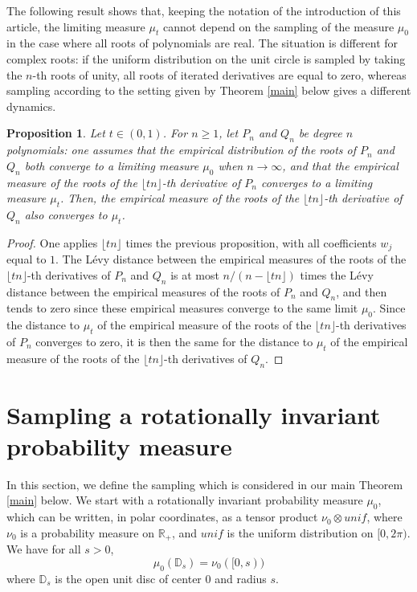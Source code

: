 \documentclass[11pt]{amsart}
\newtheorem{proposition}[theorem]{Proposition}
\begin{document}
The following result shows that, keeping the notation of the introduction of this article, 
the limiting measure $\mu_t$ cannot depend on the sampling of the measure $\mu_0$ in the case where all roots of polynomials are real. 
The situation is different for complex roots: if the uniform distribution on the unit circle is sampled by taking the $n$-th roots of unity, all roots of iterated derivatives are equal to zero, whereas 
sampling according to the setting given by Theorem \ref{main} below gives a different dynamics. 


\begin{proposition}
Let $t \in (0,1)$. 
For $n \geq 1$, let $P_n$ and $Q_n$ be degree $n$ polynomials: one assumes that the empirical distribution of the roots of $P_n$ and $Q_n$ both converge to a limiting measure $\mu_0$ when $n \rightarrow \infty$, and 
that the empirical measure of the roots of the $\lfloor t n \rfloor$-th derivative of $P_n$ converges to a limiting measure $\mu_t$. Then, the empirical measure of the roots of the $\lfloor t n \rfloor$-th derivative of $Q_n$ also converges to $\mu_t$.
\end{proposition}
\begin{proof}
One applies $\lfloor t n \rfloor$ times the previous proposition, with all coefficients $w_j$ equal to $1$. 
The L\'evy distance between the empirical measures of the roots of the  $\lfloor t n \rfloor$-th derivatives of $P_n$ and $Q_n$ is at most $n/(n - \lfloor t n \rfloor)$ times the L\'evy distance between the empirical measures of the roots of $P_n$ and $Q_n$, and 
then tends to zero since these empirical measures converge to the same limit $\mu_0$. 
Since the distance to $\mu_t$ of the empirical measure
 of the roots of the  $\lfloor t n \rfloor$-th derivatives of $P_n$ converges to zero, it is then the same for the distance to $\mu_t$ of the empirical measure
 of the roots of the  $\lfloor t n \rfloor$-th derivatives of $Q_n$. 
\end{proof}


 



\section{Sampling  a  rotationally invariant probability measure} \label{3}
In this section, we define the sampling which is considered in our main Theorem \ref{main} below.
We start with a
rotationally invariant probability measure $\mu_0$, 
which can be written, in polar coordinates, as a tensor product $\nu_0 \otimes unif$, where $\nu_0$ is a probability measure on $\mathbb{R}_+$, and 
$unif$ is the uniform distribution on $[0, 2 \pi)$.
We have for all $s > 0$, 
$$\mu_0 (\mathbb{D}_s) = \nu_0 ([0,s))$$
where $\mathbb{D}_s$ is the open unit disc of center $0$ and radius $s$. 
\end{document}
